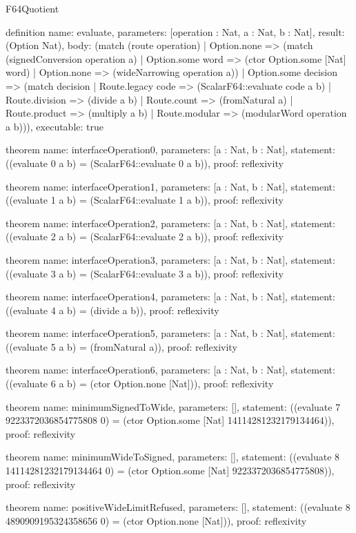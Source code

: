 \begin{lexlean}{F64Quotient}
\begin{semanticmodule}
definition{
  name: evaluate,
  parameters: [operation : Nat, a : Nat, b : Nat],
  result: (Option Nat),
  body: (match (route operation)
    | Option.none => (match (signedConversion operation a)
      | Option.some word => (ctor Option.some [Nat] word)
      | Option.none => (wideNarrowing operation a))
    | Option.some decision => (match decision
      | Route.legacy code => (ScalarF64::evaluate code a b)
      | Route.division => (divide a b)
      | Route.count => (fromNatural a)
      | Route.product => (multiply a b)
      | Route.modular => (modularWord operation a b))),
  executable: true
}

theorem{
  name: interfaceOperation0,
  parameters: [a : Nat, b : Nat],
  statement: ((evaluate 0 a b) = (ScalarF64::evaluate 0 a b)),
  proof: reflexivity{}
}

theorem{
  name: interfaceOperation1,
  parameters: [a : Nat, b : Nat],
  statement: ((evaluate 1 a b) = (ScalarF64::evaluate 1 a b)),
  proof: reflexivity{}
}

theorem{
  name: interfaceOperation2,
  parameters: [a : Nat, b : Nat],
  statement: ((evaluate 2 a b) = (ScalarF64::evaluate 2 a b)),
  proof: reflexivity{}
}

theorem{
  name: interfaceOperation3,
  parameters: [a : Nat, b : Nat],
  statement: ((evaluate 3 a b) = (ScalarF64::evaluate 3 a b)),
  proof: reflexivity{}
}

theorem{
  name: interfaceOperation4,
  parameters: [a : Nat, b : Nat],
  statement: ((evaluate 4 a b) = (divide a b)),
  proof: reflexivity{}
}

theorem{
  name: interfaceOperation5,
  parameters: [a : Nat, b : Nat],
  statement: ((evaluate 5 a b) = (fromNatural a)),
  proof: reflexivity{}
}

theorem{
  name: interfaceOperation6,
  parameters: [a : Nat, b : Nat],
  statement: ((evaluate 6 a b) = (ctor Option.none [Nat])),
  proof: reflexivity{}
}

theorem{
  name: minimumSignedToWide,
  parameters: [],
  statement: ((evaluate 7 9223372036854775808 0) = (ctor Option.some [Nat] 14114281232179134464)),
  proof: reflexivity{}
}

theorem{
  name: minimumWideToSigned,
  parameters: [],
  statement: ((evaluate 8 14114281232179134464 0) = (ctor Option.some [Nat] 9223372036854775808)),
  proof: reflexivity{}
}

theorem{
  name: positiveWideLimitRefused,
  parameters: [],
  statement: ((evaluate 8 4890909195324358656 0) = (ctor Option.none [Nat])),
  proof: reflexivity{}
}


\end{semanticmodule}
\end{lexlean}
